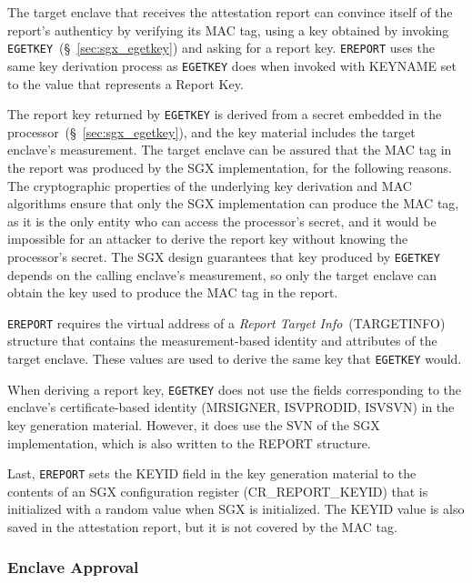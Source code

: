 The target enclave that receives the attestation report can convince itself of
the report's authenticy by verifying its MAC tag, using a key obtained by
invoking \texttt{EGETKEY}~(\S~\ref{sec:sgx_egetkey}) and asking for a report
key. \texttt{EREPORT} uses the same key derivation process as \texttt{EGETKEY}
does when invoked with KEYNAME set to the value that represents a Report Key.

The report key returned by \texttt{EGETKEY} is derived from a secret embedded
in the processor~(\S~\ref{sec:sgx_egetkey}), and the key material includes the
target enclave's measurement. The target enclave can be assured that the MAC
tag in the report was produced by the SGX implementation, for the following
reasons. The cryptographic properties of the underlying key derivation and
MAC algorithms ensure that only the SGX implementation can produce the MAC tag,
as it is the only entity who can access the processor's secret, and it would be
impossible for an attacker to derive the report key without knowing the
processor's secret. The SGX design guarantees that key produced by
\texttt{EGETKEY} depends on the calling enclave's measurement, so only the
target enclave can obtain the key used to produce the MAC tag in the report.

\texttt{EREPORT} requires the virtual address of a
\textit{Report Target Info}~(TARGETINFO) structure that contains the
measurement-based identity and attributes of the target enclave. These values
are used to derive the same key that \texttt{EGETKEY} would.

When deriving a report key, \texttt{EGETKEY} does not use the fields
corresponding to the enclave's certificate-based identity (MRSIGNER, ISVPRODID,
ISVSVN) in the key generation material. However, it does use the SVN of the
SGX implementation, which is also written to the REPORT structure.

Last, \texttt{EREPORT} sets the KEYID field in the key generation material to
the contents of an SGX configuration register (CR\_REPORT\_KEYID) that is
initialized with a random value when SGX is initialized. The KEYID value is
also saved in the attestation report, but it is not covered by the MAC tag.


\subsubsection{Enclave Approval}
\label{sec:sgx_launch_enclave}


